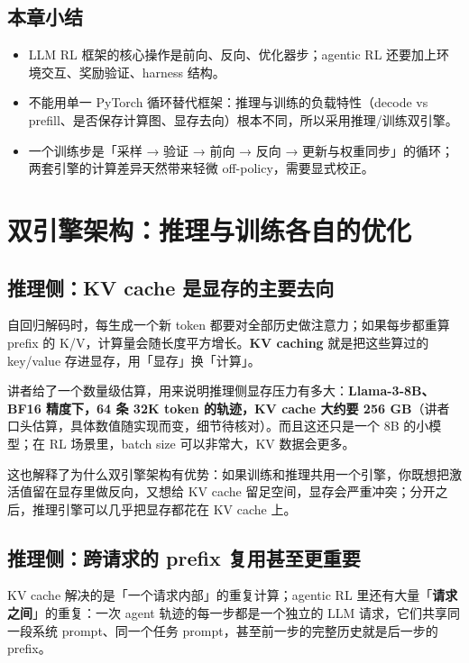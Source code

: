 \documentclass[a4paper]{article}
\begin{document}
\subsection{本章小结}

\begin{itemize}
\item LLM RL 框架的核心操作是前向、反向、优化器步；agentic RL 还要加上环境交互、奖励验证、harness 结构。
\item 不能用单一 PyTorch 循环替代框架：推理与训练的负载特性（decode vs prefill、是否保存计算图、显存去向）根本不同，所以采用推理/训练双引擎。
\item 一个训练步是「采样 → 验证 → 前向 → 反向 → 更新与权重同步」的循环；两套引擎的计算差异天然带来轻微 off-policy，需要显式校正。
\end{itemize}

\section{双引擎架构：推理与训练各自的优化}

\subsection{推理侧：KV cache 是显存的主要去向}

自回归解码时，每生成一个新 token 都要对全部历史做注意力；如果每步都重算 prefix 的 K/V，计算量会随长度平方增长。\textbf{KV caching} 就是把这些算过的 key/value 存进显存，用「显存」换「计算」。

讲者给了一个数量级估算，用来说明推理侧显存压力有多大：\textbf{Llama-3-8B、BF16 精度下，64 条 32K token 的轨迹，KV cache 大约要 256 GB}（讲者口头估算，具体数值随实现而变，细节待核对）。而且这还只是一个 8B 的小模型；在 RL 场景里，batch size 可以非常大，KV 数据会更多。

这也解释了为什么双引擎架构有优势：如果训练和推理共用一个引擎，你既想把激活值留在显存里做反向，又想给 KV cache 留足空间，显存会严重冲突；分开之后，推理引擎可以几乎把显存都花在 KV cache 上。

\subsection{推理侧：跨请求的 prefix 复用甚至更重要}

KV cache 解决的是「一个请求内部」的重复计算；agentic RL 里还有大量「\textbf{请求之间}」的重复：一次 agent 轨迹的每一步都是一个独立的 LLM 请求，它们共享同一段系统 prompt、同一个任务 prompt，甚至前一步的完整历史就是后一步的 prefix。
\end{document}
